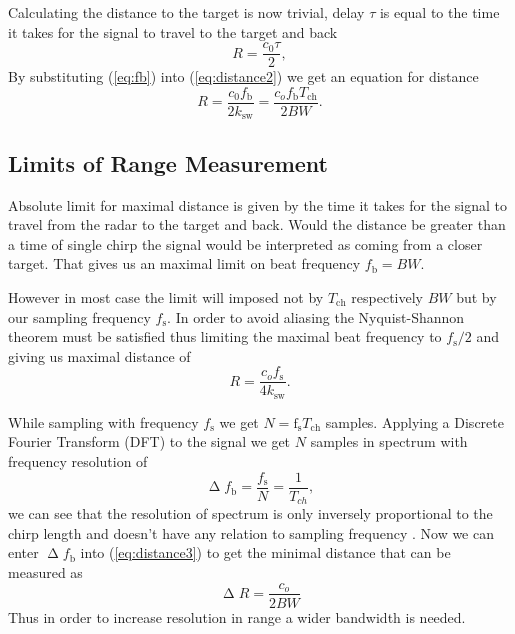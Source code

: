 Calculating the distance to the target is now trivial, delay $\tau$ is equal to the time it takes for the signal to travel to the target and back
\begin{equation}
	R = \frac{c_0 \tau}{2},
	\label{eq:distance2}
\end{equation}
By substituting (\ref{eq:fb}) into (\ref{eq:distance2}) we get an equation for distance
\begin{equation}
	R = \frac{c_0 f_\mathrm{b}}{2k_\mathrm{sw}}= \frac{c_o f_\mathrm{b} T_{\mathrm{ch}}}{2 BW}.
	\label{eq:distance3}
\end{equation}


\subsection{Limits of Range Measurement}

Absolute limit for maximal distance is given by the time it takes for the signal to travel from the radar to the target and back.
Would the distance be greater than a time of single chirp the signal would be interpreted as coming from a closer target.
That gives us an maximal limit on beat frequency $f_\mathrm{b} = BW$.

However in most case the limit will imposed not by $T_\mathrm{ch}$ respectively $BW$ but by our sampling frequency $f_\mathrm{s}$.
In order to avoid aliasing the Nyquist-Shannon theorem must be satisfied thus limiting the maximal beat frequency to $f_\mathrm{s}/2$ and giving us maximal distance of
\begin{equation}
	R = \frac{c_o f_\mathrm{s}}{4k_\mathrm{sw}}.
	\label{eq:distance4max}
\end{equation}

While sampling with frequency $f_\mathrm{s}$ we get $N =\mathrm{f}_\mathrm{s} T_\mathrm{ch}$ samples. Applying a Discrete Fourier Transform (DFT) to the signal we get $N$ samples in spectrum with frequency resolution of
\begin{equation}
	\upDelta f_\mathrm{b} = \frac{f_\mathrm{s}}{N} = \frac{1}{T_{ch}},
	\label{eq:resolution}
\end{equation}
we can see that the resolution of spectrum is only inversely proportional to the chirp length and doesn't have any relation to sampling frequency \cite{jankiraman2018}.
Now we can enter $\upDelta f_\mathrm{b}$ into (\ref{eq:distance3}) to get the minimal distance that can be measured as
\begin{equation}
	\upDelta R = \frac{c_o}{2BW}
	\label{eq:distance5min}
\end{equation}
Thus in order to increase resolution in range a wider bandwidth is needed.

